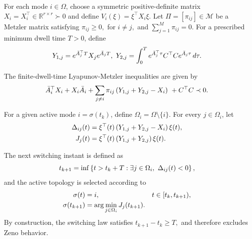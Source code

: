 \documentclass[conference]{IEEEtran}
\begin{document}
	For each mode $i\in\Omega$, choose a symmetric positive-definite
	matrix $X_i=X_i^\top\in\mathbb R^{r\times r}\succ0$ and define
	$
	V_i(\xi)=\xi^\top X_i\xi.
	$
	Let $\Pi=[\pi_{ij}]\in\mathcal{M}$ be a Metzler matrix satisfying
	$
	\pi_{ij}\geq0,
	$
	for
	$ i\neq j,
	$
	and
	$
	\sum_{j=1}^{M}\pi_{ij}=0.
	$
	For a prescribed minimum dwell time $T>0$, define
	\vspace{-0.2\baselineskip}
	\begin{equation}
		Y_{1,j}
		=
		e^{\bar A_j^\top T}X_j e^{\bar A_jT},\
		Y_{2,j}
		=
		\int_{0}^{T}
		e^{\bar A_j^\top\tau}
		C^\top C
		e^{\bar A_j\tau}
		\,d\tau .
		\label{eq:Y_definitions}
		\vspace{-0.2\baselineskip}
	\end{equation}
	
	The finite-dwell-time Lyapunov-Metzler inequalities are given by
	\vspace{-0.2\baselineskip}
	\begin{equation}
		\bar A_i^\top X_i+X_i\bar A_i
		+
		\sum_{j\neq i}
		\pi_{ij}
		\left(
		Y_{1,j}+Y_{2,j}-X_i
		\right)\
		+
		C^\top C
		\prec0.
		\label{eq:LM}
		\vspace{-0.2\baselineskip}
	\end{equation}
	
	For a given active mode $i=\sigma(t_k)$, define
	$
	\Omega_i=\Omega\setminus\{i\}.
	$
	For every $j\in\Omega_i$, let
	\vspace{-0.2\baselineskip}
	\begin{equation}
		\begin{aligned}
			\Delta_{ij}(t)
			&=
			\xi^\top(t)
			\left(
			Y_{1,j}+Y_{2,j}-X_i
			\right)
			\xi(t),\\
			J_j(t)
			&=
			\xi^\top(t)
			\left(
			Y_{1,j}+Y_{2,j}
			\right)
			\xi(t).
		\end{aligned}
		\label{eq:switching_indices}
		\vspace{-0.2\baselineskip}
	\end{equation}
	
	The next switching instant is defined as
	\vspace{-0.2\baselineskip}
	\begin{equation}
		t_{k+1}
		=
		\inf
		\left\{
		t>t_k+T:
		\exists j\in\Omega_i,\
		\Delta_{ij}(t)<0
		\right\},
		\label{eq:switching_time}
		\vspace{-0.2\baselineskip}
	\end{equation}
	and the active topology is selected according to
	\vspace{-0.2\baselineskip}
	\begin{equation}
		\begin{aligned}
			\sigma(t)
			&=
			i,
			&&t\in[t_k,t_{k+1}),\\
			\sigma(t_{k+1})
			&=
			\arg\min_{j\in\Omega_i}
			J_j(t_{k+1}).
		\end{aligned}
		\label{eq:switching_law}
		\vspace{-0.2\baselineskip}
	\end{equation}
	By construction, the switching law satisfies
	$
	t_{k+1}-t_k\geq T,
	$
	and therefore excludes Zeno behavior.
	
\end{document}
